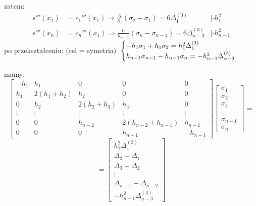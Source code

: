     \begin{frame}
    	zatem:
        \begin{align*}
        	s'''(x_{1})&=c_{1}'''(x_{1}) \Rightarrow
            \frac{6}{h_{1}}(\sigma_{2}-\sigma_{1})=6\Delta_{1}^{(3)}
            &|\cdot h_{1}^{2}
            \\
            s'''(x_{n})&=c_{n}'''(x_{1}) \Rightarrow
            \frac{6}{h_{n-1}}(\sigma_{n}-\sigma_{n-1})=6\Delta_{n-3}^{(3)}
            &|\cdot h_{n-1}^{2}
        \end{align*}
        po przekształceniu: (cel = symetria)
        $\newline \newline
        \begin{cases}
        	-h_{1}\sigma_{1}+h_{1}\sigma_{2}=h_{1}^{2}\Delta_{1}^{(3)}
            \\
		h_{n-1}\sigma_{n-1}-h_{n-1}\sigma_{n}=-h_{n-1}^{2}\Delta_{n-3}^{(3)}
        \end{cases}
        $
    \end{frame}
    \begin{frame}
    	mamy:
        \[
        \begin{bmatrix}
    -h_{1} & h_{1} & 0 & 0  & 0 \\
    h_{1} & 2(h_{1}+h_{2}) & h_{2} & 0  & 0 \\
    0 & h_{2} & 2(h_{2}+h_{3}) & h_{3} & 0 \\
    \vdots & \vdots & \vdots & \vdots & \vdots \\
    0 & 0 & h_{n-2} & 2(h_{n-2}+h_{n-1}) & h_{n-1} \\
    0 & 0 & 0 & h_{n-1}  & -h_{n-1}
		\end{bmatrix}
        \begin{bmatrix}
        	\sigma_{1} \\
            \sigma_{2} \\
            \sigma_{3} \\
            \vdots \\
            \sigma_{n-1} \\
            \sigma_{n}
        \end{bmatrix}
       	=
        \]
        \[	=
        	\begin{bmatrix}
        		h_{1}^{2}\Delta^{(3)}_{1} \\
                \Delta_{2} - \Delta_{1} \\
                \Delta_{3} - \Delta_{2} \\
                \vdots \\ 
                \Delta_{n-1} - \Delta_{n-2} \\
                -h_{n-1}^{2}\Delta^{(3)}_{n-3}
        	\end{bmatrix}
        \]
    \end{frame}
